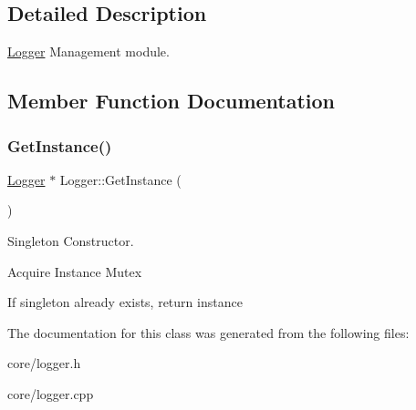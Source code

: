 \subsection{Detailed Description}
\mbox{\hyperlink{classLogger}{Logger}} Management module. 

\subsection{Member Function Documentation}
\mbox{\label{classLogger_a58ba0fb326628410e7d67fe18d2e1fbf}} 
\subsubsection{\texorpdfstring{Get\+Instance()}{GetInstance()}}
{\footnotesize\ttfamily \mbox{\hyperlink{classLogger}{Logger}} $\ast$ Logger\+::\+Get\+Instance (\begin{DoxyParamCaption}{ }\end{DoxyParamCaption})\hspace{0.3cm}{\ttfamily [static]}}



Singleton Constructor. 

Acquire Instance Mutex

If singleton already exists, return instance 

The documentation for this class was generated from the following files\+:\begin{DoxyCompactItemize}
\item 
core/logger.\+h\item 
core/logger.\+cpp\end{DoxyCompactItemize}
